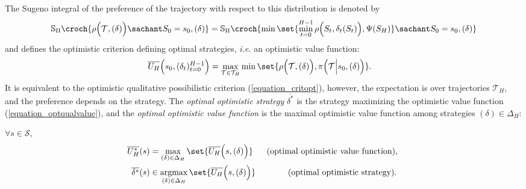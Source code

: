 The Sugeno integral of the preference of the trajectory
with respect to this distribution
is denoted by 
\[\mathbb{S}_{\Pi} \croch{ \rho \Big( \mathcal{T}, (\delta) \Big) \sachant S_0 = s_0, (\delta) } = \mathbb{S}_{\Pi} \croch{ \displaystyle \min \set{ \min_{t=0}^{H-1} \rho \Big(S_t,\delta_t(S_t) \Big), \Psi(S_H) } \sachant S_0 = s_0, (\delta) }\]
and defines the optimistic criterion defining optimal strategies,
\textit{i.e.} an optimistic value function:
\begin{align} 
\overline{U_H} \Big( s_0,(\delta_t)_{t=0}^{H-1} \Big) &= \max_{\mathcal{T} \in \mathcal{T}_H} \min \set{ \rho \Big( \mathcal{T}, (\delta) \Big), \pi \Big( \mathcal{T} \Big\vert s_0, (\delta) \Big) }. \label{equation_optqualvalue} 
\end{align}
It is equivalent to the optimistic qualitative possibilistic criterion (\ref{equation_critopt}),
however, the expectation is over trajectories $\mathcal{T}_H$, and the preference depends on the strategy.
The \textit{optimal optimistic strategy} $\overline{\delta^*}$ is the strategy
maximizing the optimistic value function (\ref{equation_optqualvalue}),
and the \textit{optimal optimistic value function}
is the maximal optimistic value function among strategies $(\delta) \in \Delta_H$:
\begin{Def}
$\forall s \in \mathcal{S}$,
\begin{align} 
\label{equation_optqualvaluestar} \overline{U_H^*}(s) &= \max_{(\delta) \in \Delta_H} \set{ \overline{U_H} \Big(s,(\delta)\Big) } & \mbox{ (optimal optimistic value function), } \\
\label{equation_optqualstratstar} \overline{\delta^*}(s) &\in \operatorname*{argmax}_{(\delta) \in \Delta_H} \set{ \overline{U_H} \Big(s,(\delta)\Big) } & \mbox{ (optimal optimistic strategy). } 
\end{align}
\end{Def}

